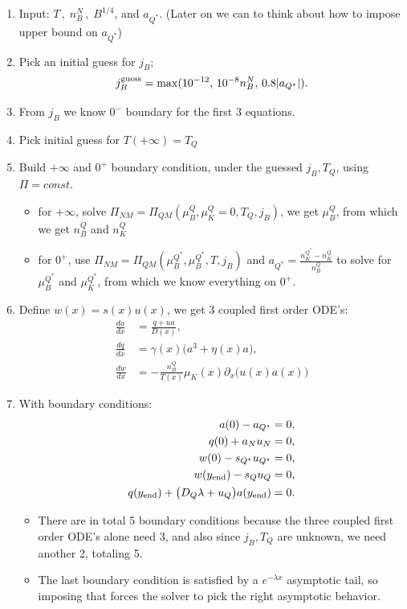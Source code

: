 \documentclass[11pt]{article}
\begin{document}
\begin{enumerate}
\item Input: $T\,,\; n_B^N\,,\; B^{1/4}$, and $a_{Q^\ast}$. (Later on we can to think about how to impose upper bound on $a_{Q^*}$)
\item Pick an initial guess for $j_B$; 
\[
j_B^{\rm guess}
=
\max(10^{-12},\,10^{-8}n_B^N,\,0.8 |a_{Q^\star}|).
\]
\item From $j_B$ we know $0^-$ boundary for the first 3 equations. 
\item Pick initial guess for $T(+\infty) = T_Q$
\item Build $+\infty$ and $0^+$ boundary condition, under the guessed $j_B, T_Q$, using $\Pi = const.$
\begin{itemize}
\item for $+\infty$, solve $\Pi_{NM} = \Pi_{QM}(\mu_B^Q, \mu_K^Q=0, T_Q, j_B)$, we get $\mu_B^Q$, from which we get $n_B^Q$ and $n_K^Q$
\item for $0^+$, use $\Pi_{NM} = \Pi_{QM}(\mu_B^{Q^*}, \mu_B^{Q^*}, T,j_B)$ and $a_{Q^*} = \frac{n_K^{Q^*} - n_K^Q}{n_B^Q}$ to solve for $\mu_B^{Q^*}$ and $\mu_K^{Q^*}$, from which we know everything on $0^+$.
\end{itemize}
\item Define $w(x) = s(x)u(x)$, we get 3 coupled first order ODE's:
\begin{align}
\frac{da}{dx} &= \frac{q+u a}{D(x)},\\
\frac{dq}{dx} &= \gamma(x)\bigl(a^3+\eta(x)a\bigr),\\
\frac{dw}{dx} &= -\frac{n_B^Q}{T(x)}\mu_K(x)\partial_x\Big(u(x) a(x)\Big)%
\end{align}
\item With boundary conditions:
\begin{align}
a(0)-a_{Q^\star} &= 0,\\
q(0)+a_Nu_N &= 0,\\
w(0)-s_{Q^\star}u_{Q^\star} &= 0,\\
w(y_{\rm end}) - s_Qu_Q &= 0,\\
q(y_{\rm end})+\bigl(D_Q\lambda+u_Q\bigr)a(y_{\rm end}) &= 0.
\end{align}
\begin{itemize}
    \item There are in total 5 boundary conditions because the three coupled first order ODE's alone need 3, and also since $j_B, T_Q$ are unknown, we need another 2, totaling 5.
    \item The last boundary condition is satisfied by a $e^{-\lambda x}$ asymptotic tail, so imposing that forces the solver to pick the right asymptotic behavior. 

\end{itemize}
\end{enumerate}
\end{document}
